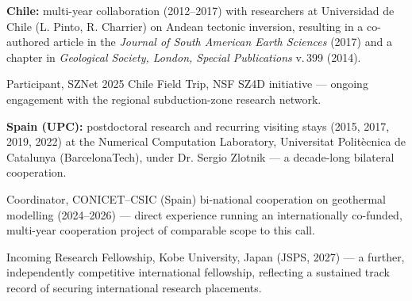 \documentclass[10pt,a4paper]{../awesome-cv}
\begin{document}
\begingroup
\fontsize{8.8pt}{11.2pt}\selectfont\bodyfontlight\color{text}
\begin{cvitems}
\item{\textbf{Chile:} multi-year collaboration (2012--2017) with researchers at Universidad de Chile (L. Pinto, R. Charrier) on Andean tectonic inversion, resulting in a co-authored article in the \emph{Journal of South American Earth Sciences} (2017) and a chapter in \emph{Geological Society, London, Special Publications} v.\,399 (2014).}
\item{Participant, SZNet 2025 Chile Field Trip, NSF SZ4D initiative --- ongoing engagement with the regional subduction-zone research network.}
\item{\textbf{Spain (UPC):} postdoctoral research and recurring visiting stays (2015, 2017, 2019, 2022) at the Numerical Computation Laboratory, Universitat Politècnica de Catalunya (BarcelonaTech), under Dr. Sergio Zlotnik --- a decade-long bilateral cooperation.}
\item{Coordinator, CONICET--CSIC (Spain) bi-national cooperation on geothermal modelling (2024--2026) --- direct experience running an internationally co-funded, multi-year cooperation project of comparable scope to this call.}
\item{Incoming Research Fellowship, Kobe University, Japan (JSPS, 2027) --- a further, independently competitive international fellowship, reflecting a sustained track record of securing international research placements.}
\end{cvitems}
\endgroup
\end{document}
